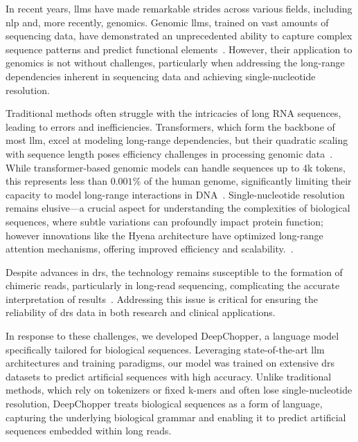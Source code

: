 \documentclass[pdflatex, sn-mathphys-num, lineno]{sn-jnl}%
\theoremstyle{thmstyleone}%
\theoremstyle{thmstyletwo}%
\theoremstyle{thmstylethree}%
\begin{document}
In recent years, \glspl{llm} have made remarkable strides across various fields, including \gls{nlp} and, more recently, genomics.
Genomic \glspl{llm}, trained on vast amounts of sequencing data, have demonstrated an unprecedented ability to capture complex sequence patterns and predict functional elements~\cite{dalla2023nucleotide, zhou2023dnabert2}.
However, their application to genomics is not without challenges, particularly when addressing the long-range dependencies inherent in sequencing data and achieving single-nucleotide resolution.

Traditional methods  often struggle with the intricacies of long RNA sequences, leading to errors and inefficiencies.
Transformers, which form the backbone of most \gls{llm}, excel at modeling long-range dependencies, but their quadratic scaling with sequence length poses efficiency challenges in processing genomic data~\cite{tay2022efficient}.
While transformer-based genomic models can handle sequences up to 4k tokens, this represents less than $0.001\%$ of the human genome, significantly limiting their capacity to model long-range interactions in DNA~\cite{dalla2023nucleotide, zhou2023dnabert2, ji2021dnabert, nguyen2024hyenadna}.
Single-nucleotide resolution remains elusive—a crucial aspect for understanding the complexities of biological sequences, where subtle variations can profoundly impact protein function; however innovations like the Hyena architecture have optimized long-range attention mechanisms, offering improved efficiency and scalability.~\cite{poli2023hyena, nguyen2024hyenadna}.

Despite advances in \gls{drs}, the technology remains susceptible to the formation of chimeric reads, particularly in long-read sequencing, complicating the accurate interpretation of results~\cite{smith2020molecular}.
Addressing this issue is critical for ensuring the reliability of \gls{drs} data in both research and clinical applications.

In response to these challenges, we developed DeepChopper, a language model specifically tailored for biological sequences.
Leveraging state-of-the-art \gls{llm} architectures and training paradigms, our model was trained on extensive \gls{drs} datasets to predict artificial sequences with high accuracy.
Unlike traditional methods, which rely on tokenizers or fixed k-mers and often lose single-nucleotide resolution, DeepChopper treats biological sequences as a form of language, capturing the underlying biological grammar and enabling it to predict artificial sequences embedded within long reads.
\end{document}
